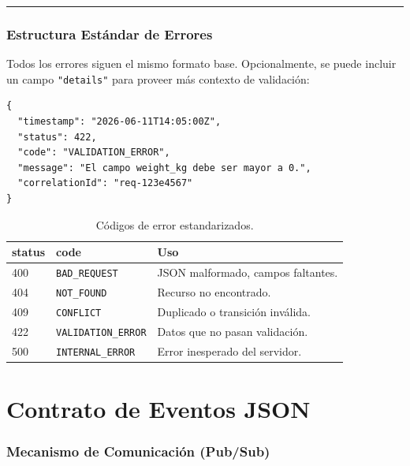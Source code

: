 \documentclass[11pt, a4paper]{article}
\begin{document}
\noindent\rule{\textwidth}{0.4pt}


\section{Estructura Estándar de Errores}
\label{sec:errores}

Todos los errores siguen el mismo formato base. Opcionalmente, se puede incluir un campo \texttt{"details"} para proveer más contexto de validación:

\begin{lstlisting}
{
  "timestamp": "2026-06-11T14:05:00Z",
  "status": 422,
  "code": "VALIDATION_ERROR",
  "message": "El campo weight_kg debe ser mayor a 0.",
  "correlationId": "req-123e4567"
}
\end{lstlisting}

\begin{table}[h!]
\centering
\renewcommand{\arraystretch}{1.3}
\begin{tabularx}{\textwidth}{l l X}
  \toprule
  \textbf{status} & \textbf{code} & \textbf{Uso} \\
  \midrule
  400 & \texttt{BAD\_REQUEST}      & JSON malformado, campos faltantes. \\
  404 & \texttt{NOT\_FOUND}        & Recurso no encontrado. \\
  409 & \texttt{CONFLICT}          & Duplicado o transición inválida. \\
  422 & \texttt{VALIDATION\_ERROR} & Datos que no pasan validación. \\
  500 & \texttt{INTERNAL\_ERROR}   & Error inesperado del servidor. \\
  \bottomrule
\end{tabularx}
\caption{Códigos de error estandarizados.}
\end{table}


\newpage
\part{Contrato de Eventos JSON}

\section{Mecanismo de Comunicación (Pub/Sub)}
\end{document}
